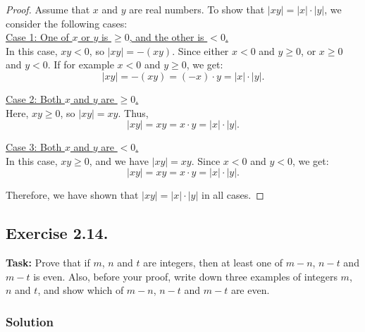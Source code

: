 \documentclass{article}
\begin{document}
\begin{proof}
    Assume that $x$ and $y$ are real numbers. To show that $|xy| = |x| \cdot |y|$, we consider the following cases: \\

    \underline{Case 1: One of $x$ or $y$ is $\geq 0$, and the other is $< 0$.} \\

    In this case, $xy < 0$, so $|xy| = -(xy)$. Since either $x < 0$ and $y \geq 0$, or $x \geq 0$ and $y < 0$. If for example $x < 0$ and $y \geq 0$, we get:
    \[
    |xy| = -(xy) = (-x) \cdot y = |x| \cdot |y|.
    \]

    \underline{Case 2: Both $x$ and $y$ are $\geq 0$.} \\

    Here, $xy \geq 0$, so $|xy| = xy$. Thus,
    \[
    |xy| = xy = x \cdot y = |x| \cdot |y|.
    \]

    \underline{Case 3: Both $x$ and $y$ are $< 0$.} \\

    In this case, $xy \geq 0$, and we have $|xy| = xy$. Since $x < 0$ and $y < 0$, we get:
    \[
    |xy| = xy = x \cdot y = |x| \cdot |y|.
    \]

    Therefore, we have shown that $|xy| = |x| \cdot |y|$ in all cases.

\end{proof}

\newpage

\subsection{Exercise 2.14.}
\textbf{Task:} Prove that if $m$, $n$ and $t$ are integers, then at least one of $m-n$, $n-t$ and $m-t$ is even. Also, before your proof, write down three examples of integers $m$, $n$ and $t$, and show which of $m-n$, $n-t$ and $m-t$ are even.

\subsubsection*{Solution}
\end{document}
